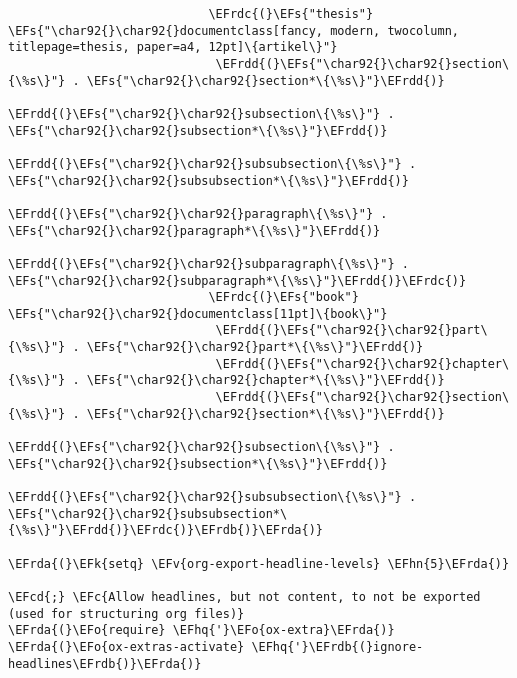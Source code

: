 \documentclass[a4wide,10pt]{article}
\newcommand{\EFc}[1]{\textcolor{EFc}{#1}} %
\newcommand{\EFcd}[1]{\textcolor{EFcd}{#1}} %
\newcommand{\EFs}[1]{\textcolor{EFs}{#1}} %
\newcommand{\EFk}[1]{\textcolor{EFk}{#1}} %
\newcommand{\EFv}[1]{\textcolor{EFv}{#1}} %
\newcommand{\EFo}[1]{\textcolor{EFo}{#1}} %
\newcommand{\EFhn}[1]{\textcolor{EFhn}{\textbf{#1}}} %
\newcommand{\EFhq}[1]{\textcolor{EFhq}{#1}} %
\newcommand{\EFrda}[1]{\textcolor{EFrda}{#1}} %
\newcommand{\EFrdb}[1]{\textcolor{EFrdb}{#1}} %
\newcommand{\EFrdc}[1]{\textcolor{EFrdc}{#1}} %
\newcommand{\EFrdd}[1]{\textcolor{EFrdd}{#1}} %
\begin{document}
\begin{Code}
\begin{Verbatim}
                            \EFrdc{(}\EFs{"thesis"} \EFs{"\char92{}\char92{}documentclass[fancy, modern, twocolumn, titlepage=thesis, paper=a4, 12pt]\{artikel\}"}
                             \EFrdd{(}\EFs{"\char92{}\char92{}section\{\%s\}"} . \EFs{"\char92{}\char92{}section*\{\%s\}"}\EFrdd{)}
                             \EFrdd{(}\EFs{"\char92{}\char92{}subsection\{\%s\}"} . \EFs{"\char92{}\char92{}subsection*\{\%s\}"}\EFrdd{)}
                             \EFrdd{(}\EFs{"\char92{}\char92{}subsubsection\{\%s\}"} . \EFs{"\char92{}\char92{}subsubsection*\{\%s\}"}\EFrdd{)}
                             \EFrdd{(}\EFs{"\char92{}\char92{}paragraph\{\%s\}"} . \EFs{"\char92{}\char92{}paragraph*\{\%s\}"}\EFrdd{)}
                             \EFrdd{(}\EFs{"\char92{}\char92{}subparagraph\{\%s\}"} . \EFs{"\char92{}\char92{}subparagraph*\{\%s\}"}\EFrdd{)}\EFrdc{)}
                            \EFrdc{(}\EFs{"book"} \EFs{"\char92{}\char92{}documentclass[11pt]\{book\}"}
                             \EFrdd{(}\EFs{"\char92{}\char92{}part\{\%s\}"} . \EFs{"\char92{}\char92{}part*\{\%s\}"}\EFrdd{)}
                             \EFrdd{(}\EFs{"\char92{}\char92{}chapter\{\%s\}"} . \EFs{"\char92{}\char92{}chapter*\{\%s\}"}\EFrdd{)}
                             \EFrdd{(}\EFs{"\char92{}\char92{}section\{\%s\}"} . \EFs{"\char92{}\char92{}section*\{\%s\}"}\EFrdd{)}
                             \EFrdd{(}\EFs{"\char92{}\char92{}subsection\{\%s\}"} . \EFs{"\char92{}\char92{}subsection*\{\%s\}"}\EFrdd{)}
                             \EFrdd{(}\EFs{"\char92{}\char92{}subsubsection\{\%s\}"} . \EFs{"\char92{}\char92{}subsubsection*\{\%s\}"}\EFrdd{)}\EFrdc{)}\EFrdb{)}\EFrda{)}

\EFrda{(}\EFk{setq} \EFv{org-export-headline-levels} \EFhn{5}\EFrda{)}

\EFcd{;} \EFc{Allow headlines, but not content, to not be exported (used for structuring org files)}
\EFrda{(}\EFo{require} \EFhq{'}\EFo{ox-extra}\EFrda{)}
\EFrda{(}\EFo{ox-extras-activate} \EFhq{'}\EFrdb{(}ignore-headlines\EFrdb{)}\EFrda{)}


\end{Verbatim}
\end{Code}
\end{document}
